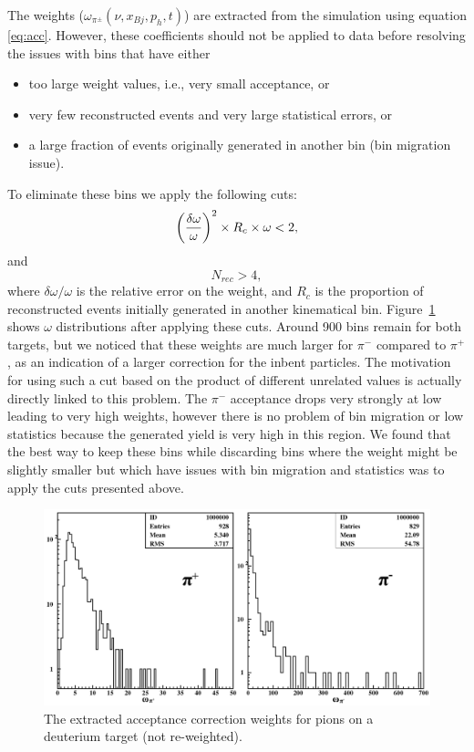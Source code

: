 The weights ($\omega_{\pi^\pm}(\nu,x_{Bj},p_h,t)$) are extracted from 
the simulation using equation \ref{eq:acc}. However, these coefficients should not be applied to data before resolving the issues with bins that have either
\begin{itemize}
 \item too large weight values, i.e., very small acceptance, or
 \item very few reconstructed events and very large statistical errors, or
 \item a large fraction of events originally generated in another bin (bin migration issue).
\end{itemize}
To eliminate these bins we apply the following cuts:
\begin{equation} \label{eq:AccL1}
\left ({\delta \omega \over \omega}\right ) ^2 \times R_c \times \omega < 2,
\end{equation}
and
\begin{equation} \label{eq:AccL2}
N_{rec} > 4,
\end{equation}
where $\delta \omega / \omega$ is the relative error on the weight, and $R_c$ is the 
proportion of reconstructed events initially generated in another kinematical bin. 
Figure~\ref{fig:AccCoef} shows $\omega$ distributions after applying these cuts. Around 
900 bins remain for both targets, but we noticed that these weights are much larger for 
$\pi^-$ compared to $\pi^+$, as an indication of a larger correction for the inbent 
particles. The motivation for using such a cut based on the product of different unrelated
values is actually directly linked to this problem. The $\pi^-$ acceptance drops very 
strongly at low \pt leading to very high weights, however there is no problem of bin migration
or low statistics because the generated yield is very high in this region. We found that 
the best way
to keep these bins while discarding bins where the weight might be slightly smaller but which 
have issues with bin migration and statistics was to apply the cuts presented above.

\begin{figure}[tbp]
\centering
\includegraphics[width=14cm] {chap5-fig/pawpipdeut.png}
\caption {The extracted acceptance correction weights for pions on a deuterium target (not re-weighted).}
\label{fig:AccCoef}
\end{figure}

